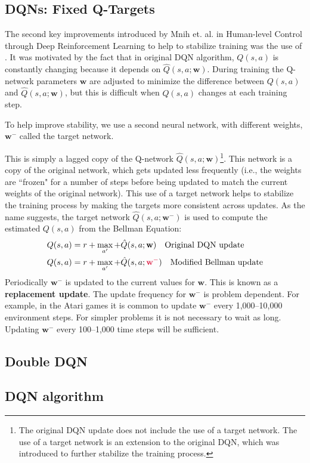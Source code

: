 \subsection{DQNs: Fixed Q-Targets}
The second key improvements introduced by Mnih et. al. in Human-level Control through Deep Reinforcement Learning to help to stabilize training was the use of . 
It was motivated by the fact that in original DQN algorithm, $Q(s,a)$ is constantly changing because it depends on  $\hat{Q}(s, a;\mathbf{w})$.
During training the Q-network parameters $\mathbf{w}$ are adjusted to minimize the difference between $Q(s,a)$ and $\hat{Q}(s, a;\mathbf{w})$, but this is difficult when $Q(s,a)$ changes at each training step.

To help improve stability, we use a second neural network, with different weights, $\mathbf{w^-}$ called the target network. 

This is simply a lagged copy of the Q-network $\hat{Q}(s, a;\mathbf{w})$\footnote{The original DQN update does not include the use of a target network. The use of a target network is an extension to the original DQN, which was introduced to further stabilize the training process.}. 
This network is a copy of the original network, which gets updated less frequently (i.e., the weights are ``frozen" for a number of steps before being updated to match the current weights of the original network). This use of a target network helps to stabilize the training process by making the targets more consistent across updates.
As the name suggests, the target network $\hat{Q}(s, a;\mathbf{w^-})$ is used to compute the estimated $Q(s,a)$ from the Bellman Equation:
\begin{align*}
    Q(s,a) &= r + \max_{a'} + \hat{Q}(s, a;\mathbf{w}) \quad  \text{Original DQN update}\\ 
    Q(s,a) &= r + \max_{a'} + \hat{Q}(s, a;\term{$\mathbf{w^-}$})
    \quad \text{Modified Bellman update}\\ 
\end{align*}
Periodically $\mathbf{w^-}$ is updated to the current values for $\mathbf{w}$. This is known as a \textbf{replacement update}. The update frequency for $\mathbf{w^-}$  is problem dependent. For example, in the Atari games it is common to update $\mathbf{w^-}$  every 1,000–10,000 environment steps. For simpler problems it is not necessary to wait as long. Updating $\mathbf{w^-}$ every 100–1,000 time steps  will be sufficient.
\subsection{Double DQN}


\subsection{DQN algorithm}



